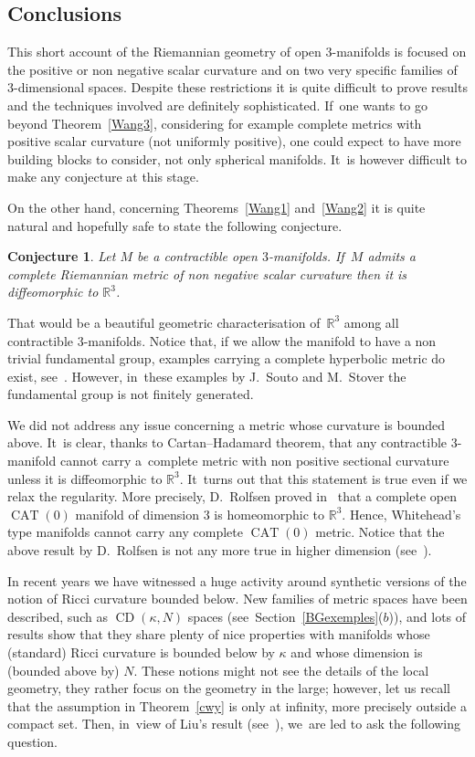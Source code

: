 \documentclass[10pt,a4paper]{amsart}
\numberwithin{equation}{section}
\newtheorem{Conjecture}[theor]{Conjecture}
\newcommand{\CDCD}{\operatorname{CD}}
\newcommand{\CAT}{\operatorname{CAT}}
\begin{document}
\subsection{Conclusions}

This short account of the Riemannian geometry of open $3$-manifolds is focused on the positive or non negative scalar curvature and on two very specific families of~$3$-dimensional spaces. Despite these restrictions it is quite difficult to prove results and the techniques involved are definitely sophisticated. If~one wants to go beyond Theorem~\ref{Wang3}, considering for example complete metrics with positive scalar curvature (not uniformly positive), one could expect to have more building blocks to consider, not only spherical manifolds. It~is however difficult to make any conjecture at this stage.

On the other hand, concerning Theorems~\ref{Wang1} and~\ref{Wang2} it is quite natural and hopefully safe to state the following conjecture.

\begin{Conjecture}
Let $M$ be a contractible open $3$-manifolds. If~$M$ admits a complete Riemannian metric of non negative scalar curvature then it is diffeomorphic
to $\mathbb{R}^{3}$.
\end{Conjecture}

That would be a beautiful geometric characterisation of~$\mathbb{R}^{3}$ among all contractible $3$-mani\-folds. Notice that, if we allow the manifold to have a non trivial fundamental group, examples carrying a complete hyperbolic metric do exist, see~\cite{Sou-Sto}. However, in~these examples by J.~Souto and M.~Stover the fundamental group is not finitely generated.

We did not address any issue concerning a metric whose curvature is bounded above. It~is clear, thanks to Cartan--Hadamard theorem, that any contractible $3$-manifold cannot carry a~complete metric with non positive sectional curvature unless it is diffeomorphic to $\mathbb{R}^{3}$. It~turns
out that this statement is true even if we relax the regularity. More precisely, D.~Rolfsen proved in~\cite{Rolf} that a complete open $\CAT(0)$ manifold of dimension $3$ is homeomorphic to $\mathbb{R}^{3}$. Hence, Whitehead's type manifolds cannot carry any complete $\CAT(0)$ metric. Notice
that the above result by D.~Rolfsen is not any more true in higher dimension (see~\cite{D-J}).

In recent years we have witnessed a huge activity around synthetic versions of the notion of Ricci curvature bounded below. New families of metric
spaces have been described, such as $\CDCD (\kappa, N)$ spaces (see~Section~\ref{BGexemples}($b$)), and lots of results show that they share plenty of
nice properties with manifolds whose (standard) Ricci curvature is bounded below by $\kappa$ and whose dimension is (bounded above by) $N$. These notions might not see the details of the local geometry, they rather focus on the geometry in the large; however, let us recall that the assumption in Theorem~\ref{cwy} is only at infinity, more precisely outside a compact set. Then, in~view of Liu's result (see~\cite{Liu}), we~are led to ask the following question.
\end{document}

